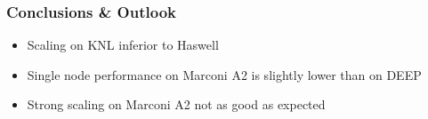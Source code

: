 \documentclass{beamer}
\begin{document}

  \begin{frame}
    \frametitle{Conclusions \& Outlook}

    \begin{itemize}
      \item Scaling on KNL inferior to Haswell
      \item Single node performance on Marconi A2 is slightly lower than on DEEP
      \item Strong scaling on Marconi A2 not as good as expected
    \end{itemize}
  \end{frame}


  \begin{frame}
    \titlepage
  \end{frame}

  
\end{document}
